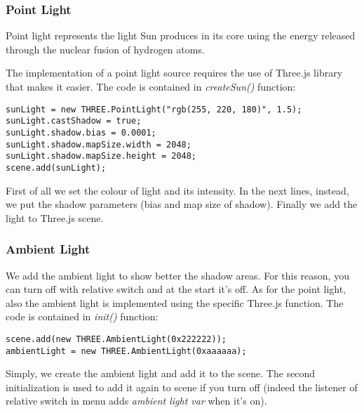 \documentclass{article}
\begin{document}
\subsubsection{Point Light}\label{subsec:pointlight}
Point light represents the light Sun produces in its core using the energy released through the nuclear fusion of hydrogen atoms\cite{solarcore:wikipedia}.
\par The implementation of a point light source requires the use of Three.js library that makes it easier\cite{documentation:threejs}. The code is contained in \textit{createSun()} function:
\begin{lstlisting}
sunLight = new THREE.PointLight("rgb(255, 220, 180)", 1.5);
sunLight.castShadow = true;
sunLight.shadow.bias = 0.0001;
sunLight.shadow.mapSize.width = 2048;
sunLight.shadow.mapSize.height = 2048;
scene.add(sunLight);
\end{lstlisting}
First of all we set the colour of light and its intensity. In the next lines, instead, we put the shadow parameters (bias and map size of shadow). Finally we add the light to Three.js scene.

\subsubsection{Ambient Light}
We add the ambient light to show better the shadow areas. For this reason, you can turn off with relative switch and at the start it's off. As for the point light, also the ambient light is implemented using the specific Three.js function\cite{documentation:threejs}. The code is contained in \textit{init()} function:
\begin{lstlisting}
scene.add(new THREE.AmbientLight(0x222222));
ambientLight = new THREE.AmbientLight(0xaaaaaa);
\end{lstlisting}
Simply, we create the ambient light and add it to the scene. The second initialization is used to add it again to scene if you turn off (indeed the listener of relative switch in menu adds \textit{ambient light var} when it's on).
\end{document}
